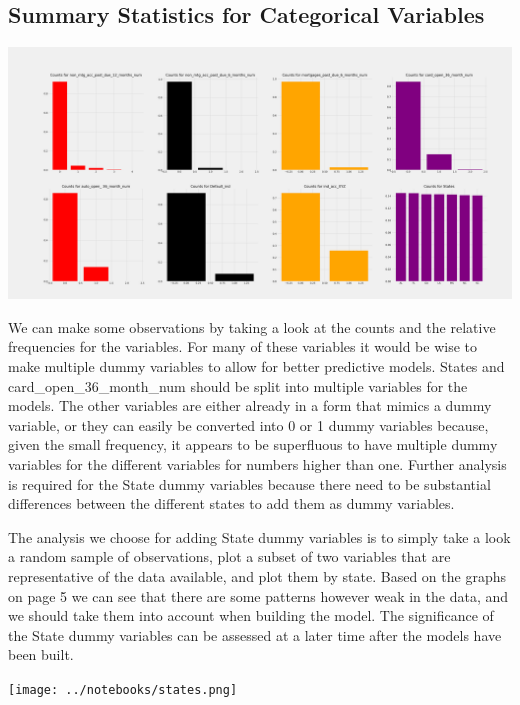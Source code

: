 \documentclass[12pt]{article}
\begin{document}
	\subsection{Summary Statistics for Categorical Variables}
	
	\begin{center}
		\includegraphics[scale=0.15]{../notebooks/counts.png}
	\end{center}
	
	We can make some observations by taking a look at the counts and the relative frequencies for the variables. For many of these variables it would be wise 
to make multiple dummy variables to allow for better predictive models. States and card\_open\_36\_month\_num should be split into multiple variables for the models. The other variables are either already in a form that mimics a dummy variable, or they can easily be converted into 0 or 1 dummy variables because, given the small frequency, it appears to be superfluous to have multiple dummy variables for the different variables for numbers higher than one. Further analysis is required for the State dummy variables because there need to be substantial differences between the different states to add them as dummy variables. 
	
	The analysis we choose for adding State dummy variables is to simply take a look a random sample of observations, plot a subset of two variables that are representative of the data available, and plot them by state. Based on the graphs on page 5 we can see that there are some patterns however weak in the data, and we should take them into account when building the model. The significance of the State dummy variables can be assessed at a later time after the models have been built. 
	
	\begin{center}
		\texttt{[image: ../notebooks/states.png]}	
	\end{center}
	
\end{document}
